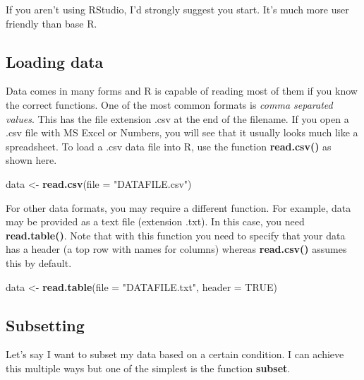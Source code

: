 \documentclass[
]{book}
\newenvironment{Shaded}{\begin{snugshade}}{\end{snugshade}}
\newcommand{\DataTypeTok}[1]{\textcolor[rgb]{0.13,0.29,0.53}{#1}}
\newcommand{\KeywordTok}[1]{\textcolor[rgb]{0.13,0.29,0.53}{\textbf{#1}}}
\newcommand{\NormalTok}[1]{#1}
\newcommand{\OtherTok}[1]{\textcolor[rgb]{0.56,0.35,0.01}{#1}}
\newcommand{\StringTok}[1]{\textcolor[rgb]{0.31,0.60,0.02}{#1}}
\begin{document}
If you aren't using RStudio, I'd strongly suggest you start. It's much more user friendly than base R.

\hypertarget{loading-data}{%
\subsection{Loading data}\label{loading-data}}

Data comes in many forms and R is capable of reading most of them if you know the correct functions. One of the most common formats is \emph{comma separated values}. This has the file extension .csv at the end of the filename. If you open a .csv file with MS Excel or Numbers, you will see that it usually looks much like a spreadsheet. To load a .csv data file into R, use the function \textbf{read.csv()} as shown here.

\begin{Shaded}
\begin{Highlighting}[]
\NormalTok{data \textless{}{-}}\StringTok{ }\KeywordTok{read.csv}\NormalTok{(}\DataTypeTok{file =} \StringTok{"DATAFILE.csv"}\NormalTok{)}
\end{Highlighting}
\end{Shaded}

For other data formats, you may require a different function. For example, data may be provided as a text file (extension .txt). In this case, you need \textbf{read.table()}. Note that with this function you need to specify that your data has a header (a top row with names for columns) whereas \textbf{read.csv()} assumes this by default.

\begin{Shaded}
\begin{Highlighting}[]
\NormalTok{data \textless{}{-}}\StringTok{ }\KeywordTok{read.table}\NormalTok{(}\DataTypeTok{file =} \StringTok{"DATAFILE.txt"}\NormalTok{, }\DataTypeTok{header =} \OtherTok{TRUE}\NormalTok{)}
\end{Highlighting}
\end{Shaded}

\hypertarget{subsetting}{%
\subsection{Subsetting}\label{subsetting}}

Let's say I want to subset my data based on a certain condition. I can achieve this multiple ways but one of the simplest is the function \textbf{subset}.
\end{document}

